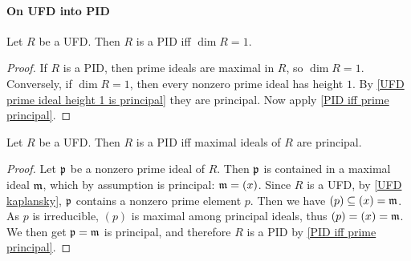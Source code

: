\paragraph{On UFD into PID}
\begin{proposition}\label{UFD PID dim=1}
Let $R$ be a UFD. Then $R$ is a PID iff $\dim R=1$.
\end{proposition}
\begin{proof}
If $R$ is a PID, then prime ideals are maximal in $R$, so $\dim R=1$. Conversely, if $\dim R=1$, then every nonzero prime ideal has height $1$. By \cref{UFD prime ideal height 1 is principal} they are principal. Now apply \cref{PID iff prime principal}.
\end{proof}
\begin{proposition}
Let $R$ be a UFD. Then $R$ is a PID iff maximal ideals of $R$ are principal.
\end{proposition}
\begin{proof}
Let $\mathfrak{p}$ be a nonzero prime ideal of $R$. Then $\mathfrak{p}$ is contained in a maximal ideal $\mathfrak{m}$, which by assumption is principal: $\mathfrak{m}=(x)$. Since $R$ is a UFD, by \cref{UFD kaplansky}, $\mathfrak{p}$ contains a nonzero prime element $p$. Then we have $(p)\subseteq(x)=\mathfrak{m}$. As $p$ is irreducible, $(p)$ is maximal among principal ideals, thus $(p)=(x)=\mathfrak{m}$. We then get $\mathfrak{p}=\mathfrak{m}$ is principal, and therefore $R$ is a PID by \cref{PID iff prime principal}.
\end{proof}
